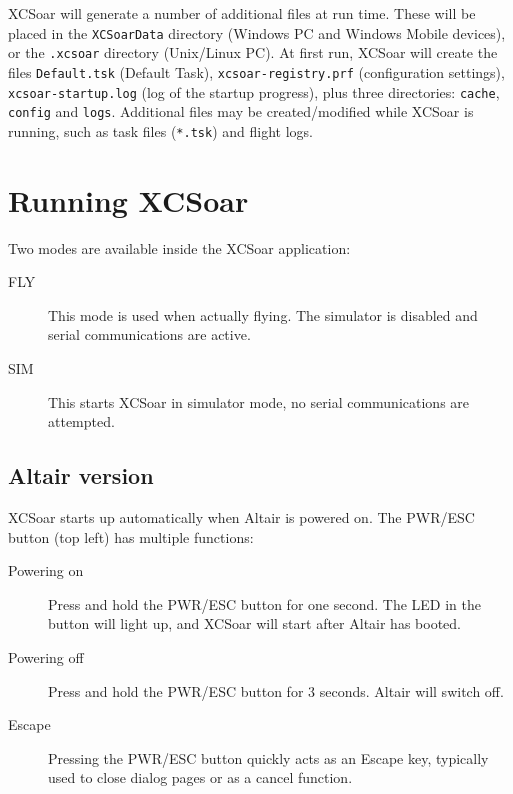 XCSoar will generate a number of additional files at run time.  These
will be placed in the  \texttt{XCSoarData} directory (Windows PC and 
Windows Mobile devices), or the \texttt{.xcsoar} directory (Unix/Linux
PC).  At first run, XCSoar will create the files 
\texttt{Default.tsk} (Default Task),  \texttt{xcsoar-registry.prf} 
(configuration settings), \newline
\texttt{xcsoar-startup.log} (log of the startup progress), 
plus three directories: \texttt{cache},
\texttt{config} and \texttt{logs}.  Additional files may be
created/modified while XCSoar is running, such as task files
(\texttt{*.tsk}) and flight logs.


\section{Running XCSoar}

Two modes are available inside the XCSoar application: 
\begin{description}
\item[FLY] This mode is used when actually flying.  The simulator is 
  disabled and serial communications are active. 
\item[SIM] This starts XCSoar in simulator mode, no serial communications
  are attempted.
\end{description}

\subsection*{Altair version}
XCSoar starts up automatically when Altair is powered on.
The PWR/ESC button (top left) has multiple functions:
\begin{description}
\item[Powering on]  Press and hold the PWR/ESC button for one second.
  The LED in the button will light up, and XCSoar will start after
  Altair has booted.
\item[Powering off]  Press and hold the PWR/ESC button for 3 seconds.
  Altair will switch off.
\item[Escape] Pressing the PWR/ESC button quickly acts as an
Escape key, typically used to close dialog pages or as a cancel function.
\end{description}

